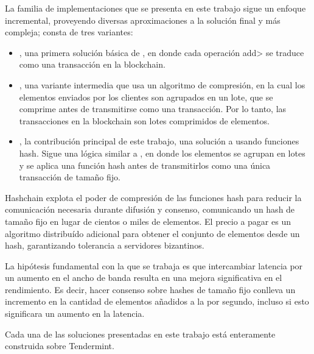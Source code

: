 %
%

La familia de implementaciones que se presenta en este trabajo
sigue un enfoque incremental, proveyendo diversas aproximaciones
a la solución final y más compleja; consta de tres variantes:
\begin{itemize}
  \item \textit{\vanilla}, una primera solución básica de \setchain, en donde cada operación
  \<add> se traduce como una transacción en la blockchain.
  \item \textit{\compresschain}, una variante intermedia que usa un algoritmo de compresión,
  en la cual los elementos enviados por los clientes son agrupados en un lote, que se comprime antes
  de transmitirse como una transacción. Por lo tanto, las transacciones en la blockchain son
  lotes comprimidos de elementos.
  \item \textit{\hashchain}, la contribución principal de este trabajo, una solución 
  a \setchain usando funciones hash. Sigue una lógica similar a \compresschain,
  en donde los elementos se agrupan en lotes y se aplica una función hash antes de transmitirlos
  como una única transacción de tamaño fijo.
\end{itemize}
%
Hashchain explota el poder de compresión de las funciones hash para reducir la
comunicación necesaria durante difusión y consenso, comunicando un hash de tamaño
fijo en lugar de cientos o miles de elementos.
%
El precio a pagar es un algoritmo distribuído adicional para obtener el conjunto de
elementos desde un hash, garantizando tolerancia a servidores bizantinos.
%

La hipótesis fundamental con la que se trabaja es que intercambiar latencia por un aumento en el
ancho de banda resulta en una mejora significativa en el rendimiento.
%
Es decir, hacer consenso sobre hashes de tamaño fijo conlleva un incremento en la cantidad de elementos
añadidos a la \setchain por segundo, incluso si esto significara un aumento en la latencia.

Cada una de las soluciones presentadas en este trabajo está enteramente construida sobre Tendermint.



